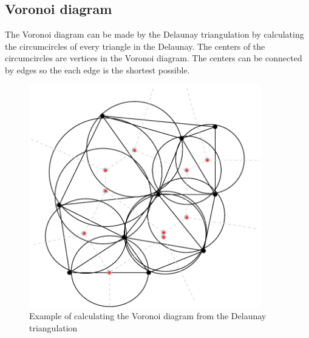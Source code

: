 \documentclass[10pt]{article}
\begin{document}
\subsection{Voronoi diagram} %
\label{sub:voronoi_diagram}
The Voronoi diagram can be made by the Delaunay triangulation by calculating the circumcircles of every triangle in the Delaunay. The centers of the circumcircles are vertices in the Voronoi diagram. The centers can be connected by edges so the each edge is the shortest possible. 

\begin{figure}[ht]
\centering
\includegraphics[width=0.9\textwidth]{figures/fig23.pdf}
\caption{Example of calculating the Voronoi diagram from the Delaunay triangulation}
\label{fig23}
\end{figure}



                                       
\end{document}

